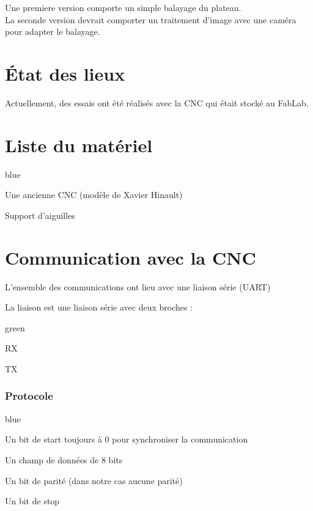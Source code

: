 {Une premiere version comporte un simple balayage du plateau.\\
La seconde version devrait comporter un traitement d'image avec une caméra pour adapter le balayage.


\section{État des lieux}

Actuellement, des essais ont été réalisés avec la CNC qui était stocké au FabLab.\\

\section{Liste du matériel}


\begin{items}{blue}{\Triangle}
    \item Une ancienne CNC (modèle de Xavier Hinault)
    \item Support d'aiguilles
\end{items}


\section{Communication avec la CNC}

L'ensemble des communications ont lieu avec une liaison série (UART)


La liaison  est une liaison série avec deux broches :

\begin{items}{green}{\Triangle}
   \item RX
   \item TX
\end{items}

\subsubsection{Protocole}

\begin{items}{blue}{\Circle}
   \item Un bit de start toujours à 0 pour synchroniser la communication
   \item Un champ de données de 8 bits
   \item Un bit de parité (dans notre cas aucune parité)
   \item Un bit de stop
\end{items}

}
